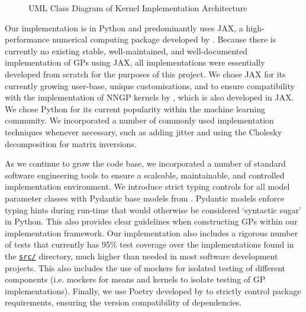 \documentclass{article}
\def\code#1{\texttt{#1}}
\numberwithin{equation}{section}
\begin{document}
\begin{figure}[h!]
\begin{center}
{
}
\caption{UML Class Diagram of Kernel Implementation Architecture}
\label{kernel-implementation}
\end{center}
\end{figure}

Our implementation is in Python and predominantly uses JAX, a high-performance numerical computing package developed by \cite{jax2018github}.
Because there is currently no existing stable, well-maintained, and well-documented implementation of GPs using JAX, all implementations were essentially developed from scratch for the purposes of this project.
We chose JAX for its currently growing user-base, unique customisations, and to ensure compatibility with the implementation of NNGP kernels by \cite{novak2019neural}, which is also developed in JAX.
We chose Python for its current popularity within the machine learning community.
We incorporated a number of commonly used implementation techniques whenever necessary, such as adding jitter and using the Cholesky decomposition for matrix inversions.

As we continue to grow the code base, we incorporated a number of standard software engineering tools to ensure a scaleable, maintainable, and controlled implementation environment.
We introduce strict typing controls for all model parameter classes with Pydantic base models from \cite{samuel_colvin_2023_8277473}.
Pydantic models enforce typing hints during run-time that would otherwise be considered `syntactic sugar' in Python. This also provides clear guidelines when constructing GPs within our implementation framework.
Our implementation also includes a rigorous number of tests that currently has 95\% test coverage over the implementations found in the \href{https://github.com/jswu18/generalised-variational-inference-for-gaussian-processes/tree/main/src}{\code{src/}} directory, much higher than needed in most software development projects.
This also includes the use of mockers for isolated testing of different components (i.e. mockers for means and kernels to isolate testing of GP implementations). 
Finally, we use Poetry developed by \cite{Eustace} to strictly control package requirements, ensuring the version compatibility of dependencies.
\end{document}
